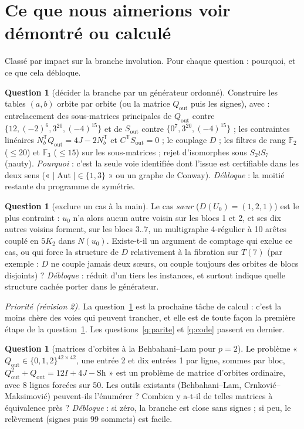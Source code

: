 \documentclass[11pt,a4paper]{article}
\theoremstyle{definition}
\newtheorem{question}[theorem]{Question}
\theoremstyle{remark}
\newcommand{\F}{\mathbb{F}}
\newcommand{\Aut}{\operatorname{Aut}}
\newcommand{\Sh}{\mathrm{Sh}}
\newcommand{\Sout}{S_{\mathrm{out}}}
\newcommand{\Qout}{Q_{\mathrm{out}}}
\begin{document}
\section{Ce que nous aimerions voir démontré ou calculé}\label{sec:demontrer}
Classé par impact sur la branche involution. Pour chaque question : pourquoi, et ce que cela débloque.

\begin{question}[décider la branche par un générateur ordonné]\label{q:gen}
Construire les tables $(a,b)$ orbite par orbite (ou la matrice $\Qout$ puis les signes), avec : entrelacement des sous-matrices principales de $\Qout$ contre $\{12,(-2)^6,3^{20},(-4)^{15}\}$ et de $\Sout$ contre $\{0^7,3^{20},(-4)^{15}\}$ ; les contraintes linéaires $N_b^{\mathsf T}\Qout=4J-2N_b^{\mathsf T}$ et $C^{\mathsf T}\Sout=0$ ; le couplage $D$ ; les filtres de rang $\F_2$ ($\le20$) et $\F_3$ ($\le15$) sur les sous-matrices ; rejet d'isomorphes sous $S_2\wr S_7$ (nauty). \emph{Pourquoi} : c'est la seule voie identifiée dont l'issue est certifiable dans les deux sens (« $|\Aut|\in\{1,3\}$ » ou un graphe de Conway). \emph{Débloque} : la moitié restante du programme de symétrie.
\end{question}

\begin{question}[exclure un cas à la main]\label{q:cas}
Le cas \emph{sœur} ($D(U_0)=(1,2,1)$) est le plus contraint : $u_0$ n'a alors aucun autre voisin sur les blocs 1 et 2, et ses dix autres voisins forment, sur les blocs $3..7$, un multigraphe 4-régulier à 10 arêtes couplé en $5K_2$ dans $N(u_0)$. Existe-t-il un argument de comptage qui exclue ce cas, ou qui force la structure de $D$ relativement à la fibration sur $T(7)$ (par exemple : $D$ ne couple jamais deux sœurs, ou couple toujours des orbites de blocs disjoints) ? \emph{Débloque} : réduit d'un tiers les instances, et surtout indique quelle structure cachée porter dans le générateur.
\end{question}

\noindent\emph{Priorité (révision 2).} La question~\ref{q:orbit} est la prochaine tâche de calcul : c'est la moins chère des voies qui peuvent trancher, et elle est de toute façon la première étape de la question~\ref{q:gen}. Les questions~\ref{q:parite} et \ref{q:code} passent en dernier.
\begin{question}[matrices d'orbites à la Behbahani--Lam pour $p=2$]\label{q:orbit}
Le problème « $\Qout\in\{0,1,2\}^{42\times42}$, une entrée 2 et dix entrées 1 par ligne, sommes par bloc, $\Qout^2+\Qout=12I+4J-\Sh$ » est un problème de matrice d'orbites ordinaire, avec 8 lignes forcées sur 50. Les outils existants (Behbahani--Lam, Crnković--Maksimović) peuvent-ils l'énumérer ? Combien y a-t-il de telles matrices à équivalence près ? \emph{Débloque} : si zéro, la branche est close sans signes ; si peu, le relèvement (signes puis $99$ sommets) est facile.
\end{question}
\end{document}

